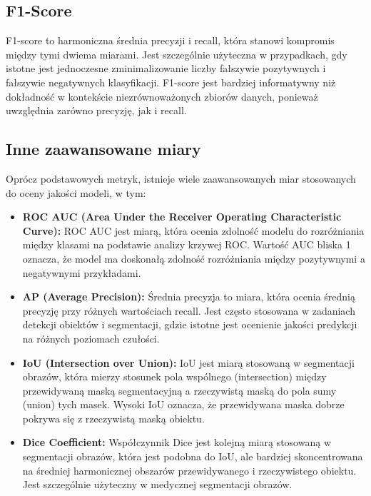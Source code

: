 \subsection*{F1-Score}

F1-score to harmoniczna średnia precyzji i recall, która stanowi kompromis między tymi dwiema miarami. 
Jest szczególnie użyteczna w przypadkach, gdy istotne jest jednoczesne zminimalizowanie liczby 
fałszywie pozytywnych i fałszywie negatywnych klasyfikacji. F1-score jest bardziej informatywny niż 
dokładność w kontekście niezrównoważonych zbiorów danych, ponieważ uwzględnia zarówno precyzję, 
jak i recall.

\subsection*{Inne zaawansowane miary}

Oprócz podstawowych metryk, istnieje wiele zaawansowanych miar stosowanych do oceny jakości modeli, 
w tym:

\begin{itemize}
    \item \textbf{ROC AUC (Area Under the Receiver Operating Characteristic Curve): }
    ROC AUC jest miarą, która ocenia zdolność modelu do rozróżniania między klasami na podstawie 
    analizy krzywej ROC. Wartość AUC bliska 1 oznacza, że model ma doskonałą zdolność rozróżniania 
    między pozytywnymi a negatywnymi przykładami.
    \item \textbf{AP (Average Precision):} Średnia precyzja to miara, która ocenia średnią precyzję 
    przy różnych wartościach recall. Jest często stosowana w zadaniach detekcji obiektów i 
    segmentacji, gdzie istotne jest ocenienie jakości predykcji na różnych poziomach czułości.
    \item \textbf{IoU (Intersection over Union):} IoU jest miarą stosowaną w segmentacji obrazów, 
    która mierzy stosunek pola wspólnego (intersection) między przewidywaną maską segmentacyjną a 
    rzeczywistą maską do pola sumy (union) tych masek. Wysoki IoU oznacza, że przewidywana maska 
    dobrze pokrywa się z rzeczywistą maską obiektu.
    \item \textbf{Dice Coefficient:} Współczynnik Dice jest kolejną miarą stosowaną w segmentacji obrazów, 
    która jest podobna do IoU, ale bardziej skoncentrowana na średniej harmonicznej obszarów 
    przewidywanego i rzeczywistego obiektu. Jest szczególnie użyteczny w medycznej segmentacji obrazów.
\end{itemize}

